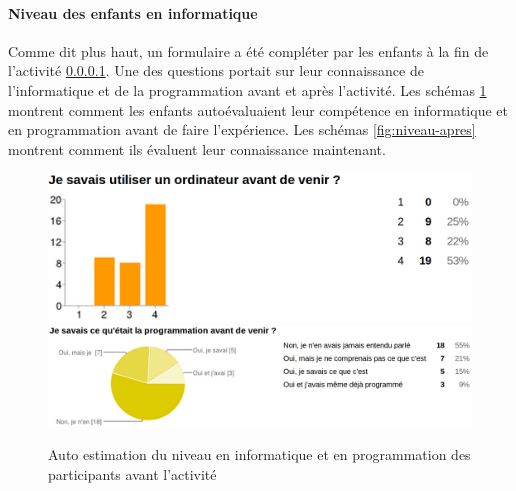 \paragraph{Niveau des enfants en informatique}
Comme dit plus haut, un formulaire a été compléter par les enfants à la fin de l'activité \ref{}. Une des questions portait sur leur connaissance de l'informatique et de la programmation avant et après l'activité. Les schémas \ref{fig:niveau-avant} montrent comment les enfants autoévaluaient leur compétence en informatique et en programmation avant de faire l'expérience. Les schémas \ref{fig:niveau-apres} montrent comment ils évaluent leur connaissance maintenant.
\begin{figure}[ht]
  \begin{center}
    \includegraphics[scale=0.3]{content/8-validation/images/avant}
    \includegraphics[scale=0.2]{content/8-validation/images/programmation}
    \caption{Auto estimation du niveau en informatique et en programmation des participants avant l'activité}
    \label{fig:niveau-avant}
  \end{center}
\end{figure}

